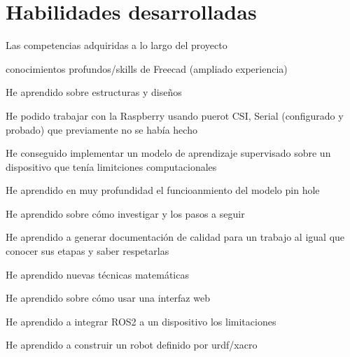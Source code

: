 
\section{Habilidades desarrolladas}

Las competencias adquiridas a lo largo del proyecto

conocimientos profundos/skills de Freecad (ampliado experiencia)

He aprendido sobre estructuras y diseños

He podido trabajar con la Raspberry usando puerot CSI, Serial (configurado y probado)  que previamente no se había hecho

He conseguido implementar un modelo de aprendizaje supervisado sobre un dispositivo que tenía limitciones computacionales

He aprendido en muy profundidad el funcioanmiento del modelo pin hole 

He aprendido sobre cómo investigar y los pasos a seguir 

He aprendido a generar documentación de calidad para un trabajo al igual que conocer sus etapas y saber respetarlas 

He aprendido nuevas técnicas matemáticas 

He aprendido sobre cómo usar una interfaz web 

He aprendido a integrar ROS2 a un dispositivo los limitaciones

He aprendido a construir un robot definido por urdf/xacro

